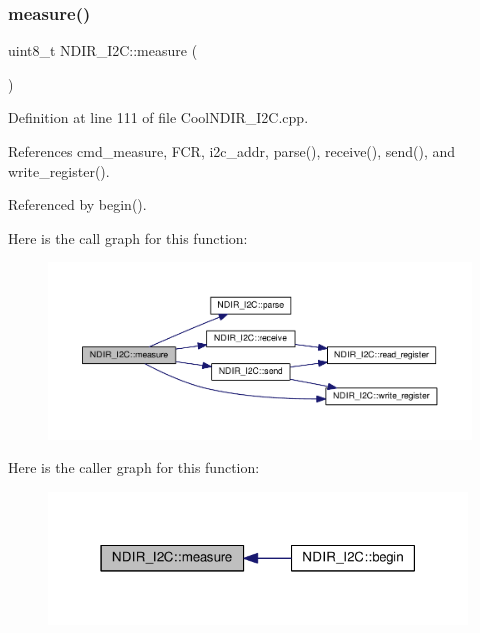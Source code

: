 \subsubsection{\texorpdfstring{measure()}{measure()}}
{\footnotesize\ttfamily uint8\+\_\+t N\+D\+I\+R\+\_\+\+I2\+C\+::measure (\begin{DoxyParamCaption}{ }\end{DoxyParamCaption})}



Definition at line 111 of file Cool\+N\+D\+I\+R\+\_\+\+I2\+C.\+cpp.



References cmd\+\_\+measure, F\+CR, i2c\+\_\+addr, parse(), receive(), send(), and write\+\_\+register().



Referenced by begin().

Here is the call graph for this function\+:
\nopagebreak
\begin{figure}[H]
\begin{center}
\leavevmode
\includegraphics[width=350pt]{d6/ddb/class_n_d_i_r___i2_c_ab8f50d38501d498b802b822bd4844ede_cgraph}
\end{center}
\end{figure}
Here is the caller graph for this function\+:\nopagebreak
\begin{figure}[H]
\begin{center}
\leavevmode
\includegraphics[width=315pt]{d6/ddb/class_n_d_i_r___i2_c_ab8f50d38501d498b802b822bd4844ede_icgraph}
\end{center}
\end{figure}
\mbox{\label{class_n_d_i_r___i2_c_aab0c04c2b7d08e99d12af044df179f0c}} 
